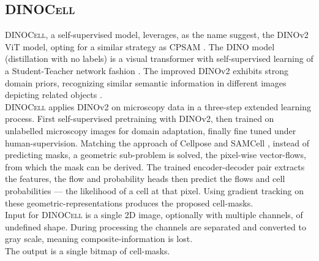 \subsection*{\color{dinocell}\textsc{DINOCell}}
\textsc{DINOCell}, a self-supervised model, leverages, as the name suggest, the DINOv2 ViT model, opting for a similar strategy as CPSAM \cite{stillwagon_self-supervised_2026}. The DINO model (distillation with no labels) is a visual transformer with self-supervised learning of a Student-Teacher network fashion \cite{caron_emerging_2021}. The improved DINOv2 exhibits strong domain priors, recognizing similar semantic information in different images depicting related objects \cite{oquab_dinov2_2024}.\\
\textsc{DINOCell} applies DINOv2 on microscopy data in a three-step extended learning process. First self-supervised pretraining with DINOv2, then trained on unlabelled microscopy images for domain adaptation, finally fine tuned under human-supervision. Matching the approach of Cellpose and SAMCell \cite{stringer_cellpose_2021} \cite{vandeloo_samcell_2025}, instead of predicting masks, a geometric sub-problem is solved, the pixel-wise vector-flows, from which the mask can be derived. The trained encoder-decoder pair extracts the features, the flow and probability heads then predict the flows and cell probabilities --- the likelihood of a cell at that pixel. Using gradient tracking on these geometric-representations produces the proposed cell-masks.\\
Input for \textsc{DINOCell} is a single 2D image, optionally with multiple channels, of undefined shape. During processing the channels are separated and converted to gray scale, meaning composite-information is lost.\\
The output is a single bitmap of cell-masks.


